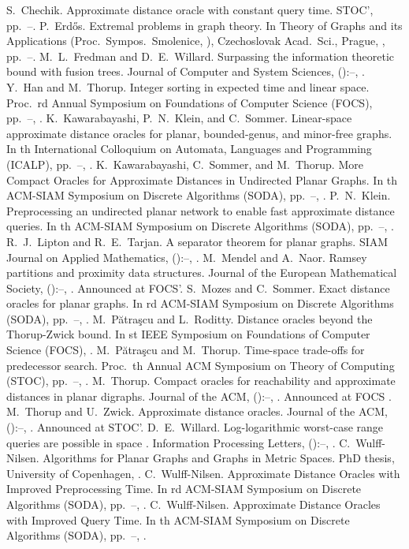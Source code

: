 \documentclass[11pt]{article}
\begin{document}
\begin{thebibliography}{99}
  S.~Chechik.
  Approximate distance oracle with constant query time.
  STOC', pp.~--.
  P.~Erd\H{o}s.
  Extremal problems in graph theory.
  In Theory of Graphs and its Applications (Proc.~Sympos.~Smolenice, ),
  Czechoslovak Acad.~Sci., Prague, , pp.~--.
  M.~L.~Fredman and D.~E.~Willard.
  Surpassing the information theoretic bound with fusion trees.
  Journal of Computer and System Sciences, ():--, . 
  Y.~Han and M.~Thorup.
  Integer sorting in  expected time and linear space.
  Proc.~rd Annual Symposium on Foundations of Computer Science (FOCS), pp.~--, .
  K.~Kawarabayashi, P.~N.~Klein, and C.~Sommer.
  Linear-space approximate distance oracles for planar, bounded-genus, and minor-free graphs.
  In th International Colloquium on Automata, Languages and Programming (ICALP), pp.~--, .
  K.~Kawarabayashi, C.~Sommer, and M.~Thorup.
  More Compact Oracles for Approximate Distances in Undirected Planar Graphs.
  In th ACM-SIAM Symposium on Discrete Algorithms (SODA), pp.~--, .
  P.~N.~Klein.
  Preprocessing an undirected planar network to enable fast approximate distance queries.
  In th ACM-SIAM Symposium on Discrete Algorithms (SODA), pp.~--, .
  R.~J.~Lipton and R.~E.~Tarjan.
  A separator theorem for planar graphs.
  SIAM Journal on Applied Mathematics, ():--, .
  M.~Mendel and A.~Naor.
  Ramsey partitions and proximity data structures.
  Journal of the European Mathematical Society, ():--, . Announced at FOCS'.
  S.~Mozes and C.~Sommer.
  Exact distance oracles for planar graphs.
  In rd ACM-SIAM Symposium on Discrete Algorithms (SODA), pp.~--, .
  M.~P\u{a}tra\c{s}cu and L.~Roditty.
  Distance oracles beyond the Thorup-Zwick bound.
  In st IEEE Symposium on Foundations of Computer Science (FOCS), .
  M.~P\u{a}tra\c{s}cu and M.~Thorup.
  Time-space trade-offs for predecessor search.
  Proc.~th Annual ACM Symposium on Theory of Computing (STOC), pp.~--, .
  M.~Thorup.
  Compact oracles for reachability and approximate distances in planar digraphs.
  Journal of the ACM, ():--, . Announced at FOCS .
  M.~Thorup and U.~Zwick.
  Approximate distance oracles.
  Journal of the ACM, ():--, . Announced at STOC'.
  D.~E.~Willard.
  Log-logarithmic worst-case range queries are possible in space .
  Information Processing Letters, ():--, .
  C.~Wulff-Nilsen.
  Algorithms for Planar Graphs and Graphs in Metric Spaces.
  PhD thesis, University of Copenhagen, .
  C.~Wulff-Nilsen.
  Approximate Distance Oracles with Improved Preprocessing Time.
  In rd ACM-SIAM Symposium on Discrete Algorithms (SODA), pp.~--, .
  C.~Wulff-Nilsen.
  Approximate Distance Oracles with Improved Query Time.
  In th ACM-SIAM Symposium on Discrete Algorithms (SODA), pp.~--, .
\end{thebibliography}
\end{document}
